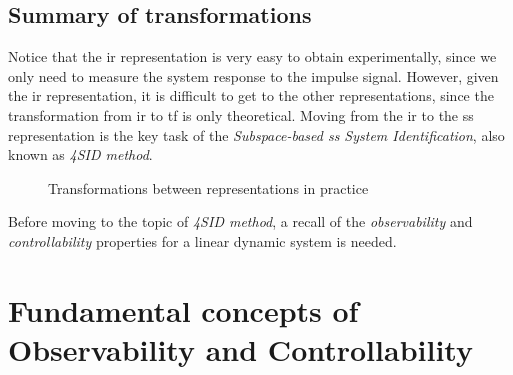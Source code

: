 \subsection{Summary of transformations}
Notice that the \gls{ir} representation is very easy to obtain experimentally, since we only need to measure the system response to the impulse signal.
However, given the \gls{ir} representation, it is difficult to get to the other representations, since the transformation from \gls{ir} to \gls{tf} is only theoretical.
Moving from the \gls{ir} to the \gls{ss} representation is the key task of the \emph{Subspace-based \acrlong{ss} System Identification}, also known as \emph{4SID method}.

\begin{figure}[H]
    \centering
    \caption*{Transformations between representations in practice}
\end{figure}


Before moving to the topic of \emph{4SID method}, a recall of the \emph{observability} and \emph{controllability} properties for a linear dynamic system is needed.

\section{Fundamental concepts of Observability and Controllability}

